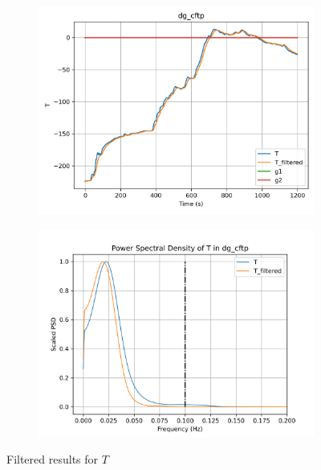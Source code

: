 \begin{figure}[H]

\begin{minipage}{0.49\textwidth}
        \begin{figure}[H]
                \centering
                \includegraphics[width = \textwidth]{./figs/tst_filt/dg_cftp/T.png}
        \end{figure}
\end{minipage}
\begin{minipage}{0.49\textwidth}
        \begin{figure}[H]
                \centering
                \includegraphics[width = \textwidth]{./figs/tst_filt/dg_cftp/T_psd.png}
        \end{figure}
\end{minipage}
\caption{Filtered results for $T$}

\end{figure}


